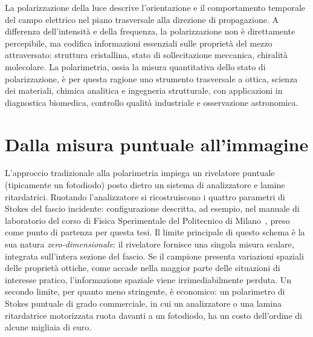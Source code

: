 {\color{black}
La polarizzazione della luce descrive l'orientazione e il comportamento temporale del campo elettrico nel piano trasversale alla direzione di propagazione. A differenza dell’intensità e della frequenza, la polarizzazione non è direttamente percepibile, ma codifica informazioni essenziali sulle proprietà del mezzo attraversato: struttura cristallina, stato di sollecitazione meccanica, chiralità molecolare. La polarimetria, ossia la misura quantitativa dello stato di polarizzazione, è per questa ragione uno strumento trasversale a ottica, scienza dei materiali, chimica analitica e ingegneria strutturale, con applicazioni in diagnostica biomedica, controllo qualità industriale e osservazione astronomica.
\par}


\section{Dalla misura puntuale all'immagine}
\label{sec:polarimetria_classica}
L'approccio tradizionale alla polarimetria impiega un rivelatore puntuale (tipicamente un fotodiodo) posto dietro un sistema di analizzatore e lamine ritardatrici. Ruotando l'analizzatore si ricostruiscono i quattro parametri di Stokes del fascio incidente: configurazione descritta, ad esempio, nel manuale di laboratorio del corso di Fisica Sperimentale del Politecnico di Milano~\cite{manuale_polarizzazione}, preso come punto di partenza per questa tesi. Il limite principale di questo schema è la sua natura \emph{zero-dimensionale}: il rivelatore fornisce una singola misura scalare, integrata sull'intera sezione del fascio. Se il campione presenta variazioni spaziali delle proprietà ottiche, come accade nella maggior parte delle situazioni di interesse pratico, l'informazione spaziale viene irrimediabilmente perduta. Un secondo limite, per quanto meno stringente, è economico: un polarimetro di Stokes puntuale di grado commerciale, in cui un analizzatore o una lamina ritardatrice motorizzata ruota davanti a un fotodiodo, ha un costo dell'ordine di alcune migliaia di euro.

